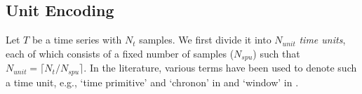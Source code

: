

\subsection{Unit Encoding}
\label{sec:Unit}
Let $T$ be a time series with $N_t$ samples.
We first divide it into $N_{unit}$ \emph{time units}, each of which consists of a fixed number of samples ($N_{spu}$) such that
$N_{unit} = \lceil N_t / N_{spu} \rceil$.
In the literature, various terms have been used to denote such a time unit, e.g., `time primitive' and `chronon' in \cite{markus13} and `window' in \cite{lin2005}.

